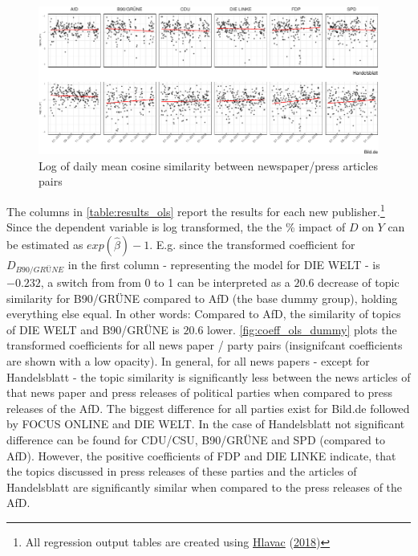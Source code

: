 \documentclass[
]{article}
\begin{document}
\begin{figure}

{\centering \includegraphics[width=0.9\linewidth]{main_text_files/figure-latex/Daily mean cosine similarity - example-1} 

}

\caption{Log of daily mean cosine similarity between newspaper/press articles pairs \label{fig:mean_cosine_sim_ols_example}}\label{fig:Daily mean cosine similarity - example}
\end{figure}

The columns in \autoref{table:results_ols} report the results for each
new publisher.\footnote{All regression output tables are created using
  \protect\hyperlink{ref-hlavac_stargazer_2018}{Hlavac}
  (\protect\hyperlink{ref-hlavac_stargazer_2018}{2018})} Since the
dependent variable is log transformed, the the \% impact of \(D\) on
\(Y\) can be estimated as \(exp(\hat\beta)-1\). E.g. since the
transformed coefficient for \(D_{B90/GRÜNE}\) in the first column -
representing the model for DIE WELT - is \(-0.232\), a switch from from
0 to 1 can be interpreted as a \(20.6%
\) decrease of topic similarity for B90/GRÜNE compared to AfD (the base
dummy group), holding everything else equal. In other words: Compared to
AfD, the similarity of topics of DIE WELT and B90/GRÜNE is \(20.6%
\) lower. \autoref{fig:coeff_ols_dummy} plots the transformed
coefficients for all news paper / party pairs (insignifcant coefficients
are shown with a low opacity). In general, for all news papers - except
for Handelsblatt - the topic similarity is significantly less between
the news articles of that news paper and press releases of political
parties when compared to press releases of the AfD. The biggest
difference for all parties exist for Bild.de followed by FOCUS ONLINE
and DIE WELT. In the case of Handelsblatt not significant difference can
be found for CDU/CSU, B90/GRÜNE and SPD (compared to AfD). However, the
positive coefficients of FDP and DIE LINKE indicate, that the topics
discussed in press releases of these parties and the articles of
Handelsblatt are significantly similar when compared to the press
releases of the AfD.
\end{document}
